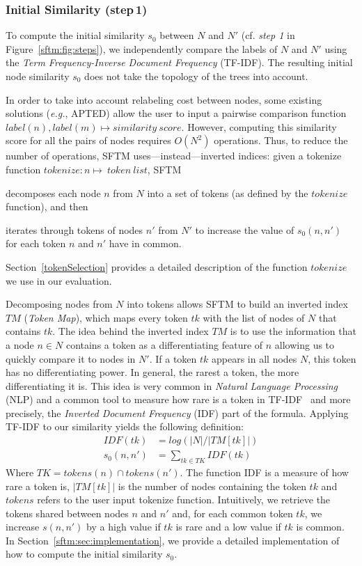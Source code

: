 \subsubsection{Initial Similarity (step\,1)}
To compute the initial similarity $s_0$ between $N$ and $N'$ (cf. \textit{step 1} in Figure~\ref{sftm:fig:steps}), we independently compare the labels of $N$ and $N'$ using the \emph{Term Frequency-Inverse Document Frequency} (TF-IDF).
The resulting initial node similarity $s_0$ does not take the topology of the trees into account.

In order to take into account relabeling cost between nodes, some existing solutions (\emph{e.g.}, APTED) allow the user to input a pairwise comparison function $label(n), label(m) \mapsto similarity\ score$.
However, computing this similarity score for all the pairs of nodes requires $O(N^2)$ operations.
Thus, to reduce the number of operations, SFTM uses---instead---inverted indices: given a tokenize function $tokenize : n \mapsto \ token\ list$, SFTM
\begin{inparaenum}
	\item decomposes each node $n$ from $N$ into a set of tokens (as defined by the $tokenize$ function), and then
    \item iterates through tokens of nodes $n'$ from $N'$ to increase the value of $s_0(n,n')$ for each token $n$ and $n'$ have in common.
\end{inparaenum}
Section~\ref{tokenSelection} provides a detailed description of the function $tokenize$ we use in our evaluation.

Decomposing nodes from $N$ into tokens allows SFTM to build an inverted index $TM$ (\emph{Token Map}), which maps every token $tk$ with the list of nodes of $N$ that contains $tk$.
The idea behind the inverted index $TM$ is to use the information that a node $n \in N$ contains a token as a differentiating feature of $n$ allowing us to quickly compare it to nodes in $N'$.
If a token $tk$ appears in all nodes $N$, this token has no differentiating power.
In general, the rarest a token, the more differentiating it is.
This idea is very common in \emph{Natural Language Processing} (NLP) and a common tool to measure how rare is a token in TF-IDF~\cite{jones1972statistical} and more precisely, the \emph{Inverted Document Frequency} (IDF) part of the formula.
Applying TF-IDF to our similarity yields the following definition:
\begin{align}
	IDF(tk) &= log(|N|/|TM[tk]|) \\
	s_0(n,n') &= \sum_{tk \in TK}IDF(tk)
\end{align}
Where $TK=tokens(n) \cap tokens(n')$.
The function IDF is a measure of how rare a token is, $|TM[tk]|$ is the number of nodes containing the token $tk$ and $tokens$ refers to the user input tokenize function.
Intuitively, we retrieve the tokens shared between nodes $n$ and $n'$ and, for each common token $tk$, we increase $s(n,n')$ by a high value if $tk$ is rare and a low value if $tk$ is common.
In Section~\ref{sftm:sec:implementation}, we provide a detailed implementation of how to compute the initial similarity $s_0$.

